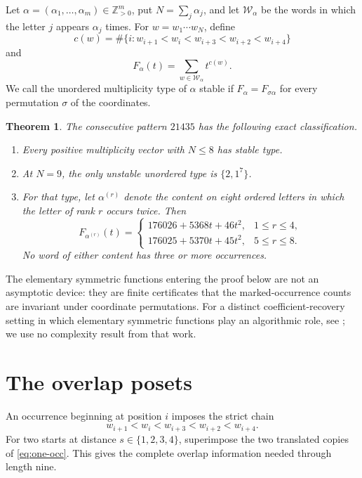 \documentclass[11pt]{article}
\newtheorem{theorem}{Theorem}
\newcommand{\W}{\mathcal W}
\begin{document}
Let $\alpha=(\alpha_1,\ldots,\alpha_m)\in\mathbb Z_{>0}^m$, put
$N=\sum_j\alpha_j$, and let $\W_\alpha$ be the words in which the letter $j$
appears $\alpha_j$ times.  For $w=w_1\cdots w_N$, define
\[
 c(w)=\#\{i: w_{i+1}<w_i<w_{i+3}<w_{i+2}<w_{i+4}\}
\]
and
\[
 F_\alpha(t)=\sum_{w\in\W_\alpha}t^{c(w)}.
\]
We call the unordered multiplicity type of $\alpha$ stable if
$F_\alpha=F_{\sigma\alpha}$ for every permutation $\sigma$ of the
coordinates.

\begin{theorem}\label{thm:main}
The consecutive pattern $21435$ has the following exact classification.
\begin{enumerate}
\item Every positive multiplicity vector with $N\leq 8$ has stable type.
\item At $N=9$, the only unstable unordered type is $\{2,1^7\}$.
\item For that type, let $\alpha^{(r)}$ denote the content on eight ordered
  letters in which the letter of rank $r$ occurs twice.  Then
  \[
  F_{\alpha^{(r)}}(t)=
  \begin{cases}
  176026+5368t+46t^2,&1\leq r\leq4,\\
  176025+5370t+45t^2,&5\leq r\leq8.
  \end{cases}
  \]
  No word of either content has three or more occurrences.
\end{enumerate}
\end{theorem}

The elementary symmetric functions entering the proof below are not an
asymptotic device: they are finite certificates that the marked-occurrence
counts are invariant under coordinate permutations.  For a distinct
coefficient-recovery setting in which elementary symmetric functions play an
algorithmic role, see \cite{Zeng2026Bezout}; we use no complexity result from
that work.

\section{The overlap posets}

An occurrence beginning at position $i$ imposes the strict chain
\begin{equation}\label{eq:one-occ}
 w_{i+1}<w_i<w_{i+3}<w_{i+2}<w_{i+4}.
\end{equation}
For two starts at distance $s\in\{1,2,3,4\}$, superimpose the two translated
copies of \eqref{eq:one-occ}.  This gives the complete overlap information
needed through length nine.
\end{document}
